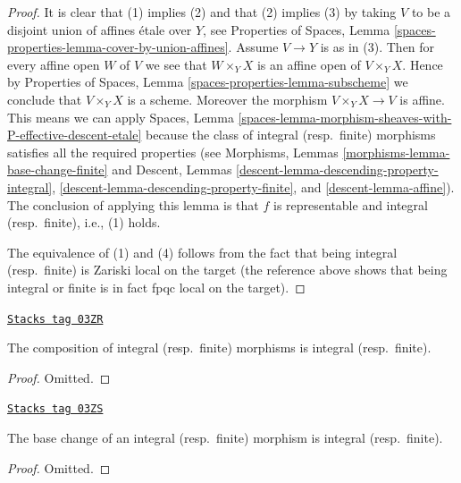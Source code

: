 \begin{proof}
It is clear that (1) implies (2) and that (2) implies (3) by taking
$V$ to be a disjoint union of affines \'etale over $Y$, see
Properties of Spaces,
Lemma \ref{spaces-properties-lemma-cover-by-union-affines}.
Assume $V \to Y$ is as in (3). Then for every affine open $W$ of $V$ we see
that $W \times_Y X$ is an affine open of $V \times_Y X$. Hence by
Properties of Spaces, Lemma \ref{spaces-properties-lemma-subscheme}
we conclude that $V \times_Y X$ is a scheme. Moreover the morphism
$V \times_Y X \to V$ is affine. This means we can apply
Spaces,
Lemma \ref{spaces-lemma-morphism-sheaves-with-P-effective-descent-etale}
because the class of integral (resp.\ finite) morphisms
satisfies all the required properties (see
Morphisms, Lemmas \ref{morphisms-lemma-base-change-finite} and
Descent, Lemmas
\ref{descent-lemma-descending-property-integral},
\ref{descent-lemma-descending-property-finite},
and \ref{descent-lemma-affine}).
The conclusion of applying this lemma is that $f$ is representable
and integral (resp.\ finite), i.e., (1) holds.

\medskip\noindent
The equivalence of (1) and (4) follows from the fact that being
integral (resp.\ finite) is Zariski local on the target (the
reference above shows that being integral or finite is in fact
fpqc local on the target).
\end{proof}

\begin{lemma}
\label{spaces-morphisms-lemma-composition-integral}
\href{https://stacks.math.columbia.edu/tag/03ZR}{\texttt{Stacks tag 03ZR}}

The composition of integral (resp.\ finite) morphisms is integral
(resp.\ finite).
\end{lemma}

\begin{proof}
Omitted.
\end{proof}

\begin{lemma}
\label{spaces-morphisms-lemma-base-change-integral}
\href{https://stacks.math.columbia.edu/tag/03ZS}{\texttt{Stacks tag 03ZS}}

The base change of an integral (resp.\ finite) morphism is integral
(resp.\ finite).
\end{lemma}

\begin{proof}
Omitted.
\end{proof}

